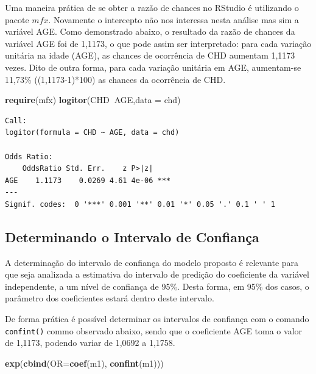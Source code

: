 \documentclass[12pt,brazil,oneside]{book}
\newenvironment{Shaded}{\begin{snugshade}}{\end{snugshade}}
\newcommand{\DataTypeTok}[1]{\textcolor[rgb]{0.13,0.29,0.53}{#1}}
\newcommand{\KeywordTok}[1]{\textcolor[rgb]{0.13,0.29,0.53}{\textbf{#1}}}
\newcommand{\NormalTok}[1]{#1}
\newcommand{\OperatorTok}[1]{\textcolor[rgb]{0.81,0.36,0.00}{\textbf{#1}}}
\begin{document}
Uma maneira prática de se obter a razão de chances no RStudio é
utilizando o pacote \(mfx\). Novamente o intercepto não nos interessa
nesta análise mas sim a variável AGE. Como demonstrado abaixo, o
resultado da razão de chances da variável AGE foi de 1,1173, o que pode
assim ser interpretado: para cada variação unitária na idade (AGE), as
chances de ocorrência de CHD aumentam 1,1173 vezes. Dito de outra forma,
para cada variação unitária em AGE, aumentam-se 11,73\% ((1,1173-1)*100)
as chances da ocorrência de CHD.

\begin{Shaded}
\begin{Highlighting}[]
\KeywordTok{require}\NormalTok{(mfx)}
\KeywordTok{logitor}\NormalTok{(CHD}\OperatorTok{~}\NormalTok{AGE,}\DataTypeTok{data =}\NormalTok{ chd)}
\end{Highlighting}
\end{Shaded}

\begin{verbatim}
Call:
logitor(formula = CHD ~ AGE, data = chd)

Odds Ratio:
    OddsRatio Std. Err.    z P>|z|    
AGE    1.1173    0.0269 4.61 4e-06 ***
---
Signif. codes:  0 '***' 0.001 '**' 0.01 '*' 0.05 '.' 0.1 ' ' 1
\end{verbatim}

\hypertarget{determinando-o-intervalo-de-confianca}{%
\subsection{Determinando o Intervalo de
Confiança}\label{determinando-o-intervalo-de-confianca}}

A determinação do intervalo de confiança do modelo proposto é relevante
para que seja analizada a estimativa do intervalo de predição do
coeficiente da variável independente, a um nível de confiança de 95\%.
Desta forma, em 95\% dos casos, o parâmetro dos coeficientes estará
dentro deste intervalo.

De forma prática é possível determinar os intervalos de confiança com o
comando \texttt{confint()} commo observado abaixo, sendo que o
coeficiente AGE toma o valor de 1,1173, podendo variar de 1,0692 a
1,1758.

\begin{Shaded}
\begin{Highlighting}[]
\KeywordTok{exp}\NormalTok{(}\KeywordTok{cbind}\NormalTok{(}\DataTypeTok{OR=}\KeywordTok{coef}\NormalTok{(m1), }\KeywordTok{confint}\NormalTok{(m1)))}
\end{Highlighting}
\end{Shaded}
\end{document}
